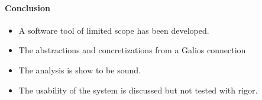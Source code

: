 \paragraph{Conclusion}

\begin{itemize}
    \item A software tool of limited scope has been developed.
    \item The abstractions and concretizations from a Galios connection
    \item The analysis is show to be sound.
    \item The usability of the system is discussed but not tested with rigor. 
\end{itemize}







